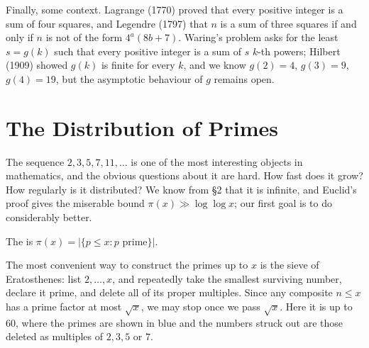 \documentclass[a4paper]{scrartcl}
\begin{document}
Finally, some context. Lagrange (1770) proved that every positive integer is a sum of four squares, and Legendre (1797) that $n$ is a sum of three squares if and only if $n$ is not of the form $4^a(8b+7)$. Waring's problem asks for the least $s = g(k)$ such that every positive integer is a sum of $s$ $k$-th powers; Hilbert (1909) showed $g(k)$ is finite for every $k$, and we know $g(2) = 4$, $g(3) = 9$, $g(4) = 19$, but the asymptotic behaviour of $g$ remains open.

\section{The Distribution of Primes}

The sequence $2, 3, 5, 7, 11, \dots$ is one of the most interesting objects in mathematics, and the obvious questions about it are hard. How fast does it grow? How regularly is it distributed? We know from \S2 that it is infinite, and Euclid's proof gives the miserable bound $\pi(x) \gg \log\log x$; our first goal is to do considerably better.

\begin{definition}
	The  is $\pi(x) = |\{p \leq x : p \text{ prime}\}|$.
\end{definition}

The most convenient way to construct the primes up to $x$ is the sieve of Eratosthenes: list $2, \dots, x$, and repeatedly take the smallest surviving number, declare it prime, and delete all of its proper multiples. Since any composite $n \leq x$ has a prime factor at most $\sqrt x$, we may stop once we pass $\sqrt x$. Here it is up to $60$, where the primes are shown in blue and the numbers struck out are those deleted as multiples of $2, 3, 5$ or $7$.

\begin{center}
\end{center}
\end{document}
